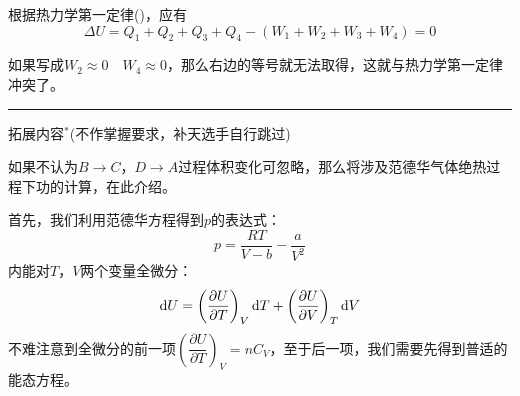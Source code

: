 \begin{solution}
    根据热力学第一定律()，应有
    \[\Delta U= Q_1+Q_2+Q_3+Q_4-(W_1+W_2+W_3+W_4)=0\]

    如果写成$W_2\approx 0\quad W_4\approx 0$，那么右边的等号就无法取得，这就与热力学第一定律冲突了。
    \vspace*{1ex}
    \hrule
    {
        \em
        \begin{center}
            拓展内容$^*$(不作掌握要求，补天选手自行跳过)
        \end{center}

        如果不认为$B\rightarrow C$，$D\rightarrow A$过程体积变化可忽略，那么将涉及范德华气体绝热过程下功的计算，在此介绍。

        首先，我们利用范德华方程得到$p$的表达式：
        \begin{equation*}
            p = \frac{RT}{V - b} - \frac{a}{V^2}
        \end{equation*}
        内能对$T$，$V$两个变量全微分：
        \begin{equation*}
            \dif U = \left(\frac{\partial U}{\partial T}\right)_{V} \dif T + \left(\frac{\partial U}{\partial V}\right)_{T} \dif V
        \end{equation*}
        不难注意到全微分的前一项$\left(\dfrac{\partial U}{\partial T}\right)_{V} = nC_{V}$，至于后一项，我们需要先得到普适的能态方程。

}
\end{solution}
